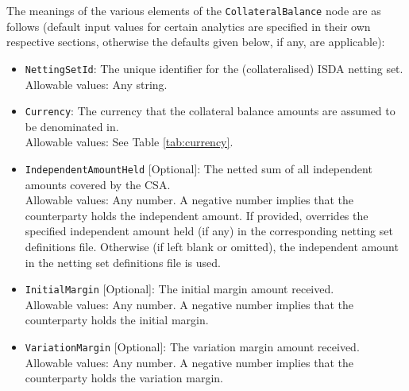 The meanings of the various elements of the \lstinline!CollateralBalance!
node are as follows (default input values for certain analytics are
specified in their own respective sections, otherwise the
defaults given below, if any, are applicable):
\begin{itemize}
\item \lstinline!NettingSetId!: The unique identifier for the (collateralised) ISDA netting set.
\ifdefined{}\fi \\
  Allowable values: Any string.
\item \lstinline!Currency!: The currency that the collateral balance amounts are assumed to be
denominated in.\\
  Allowable values: See Table \ref{tab:currency}.
\item \lstinline!IndependentAmountHeld! [Optional]: The netted sum of all independent amounts
covered by the CSA.\\
  Allowable values: Any number. A negative number implies that the counterparty holds
  the independent amount. If provided, overrides the specified independent amount held (if any)
  in the corresponding netting set definitions file. Otherwise (if left blank or omitted),
  the independent amount in the netting set definitions file is used.
\item \lstinline!InitialMargin! [Optional]: The initial margin amount received.\\
  Allowable values: Any number. A negative number implies that the counterparty holds
  the initial margin.
\item \lstinline!VariationMargin! [Optional]: The variation margin amount received.\\
  Allowable values: Any number. A negative number implies that the counterparty holds
  the variation margin.
\end{itemize}
